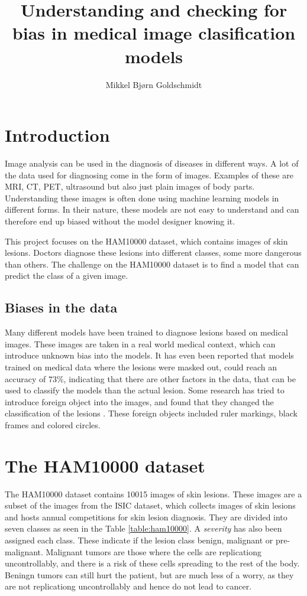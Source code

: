 \documentclass[11pt,a4paper]{article}
\title{Understanding and checking for bias in medical image clasification models}
\author{Mikkel Bjørn Goldschmidt}
\begin{document}
\maketitle

\section{Introduction}
Image analysis can be used in the diagnosis of diseases in different ways.
A lot of the data used for diagnosing come in the form of images.
Examples of these are MRI, CT, PET, ultrasound but also just plain images of body parts.
Understanding these images is often done using machine learning models in different forms.
In their nature, these models are not easy to understand and can therefore end up biased without
the model designer knowing it.

This project focuses on the HAM10000 dataset\cite{Tschandl_2018}, which contains images of skin lesions.
Doctors diagnose these lesions into different classes, some more dangerous than others.
The challenge on the HAM10000 dataset is to find a model that can predict the class of a given image.

\subsection{Biases in the data}
Many different models have been trained to diagnose lesions based on medical images.
These images are taken in a real world medical context, which can introduce unknown bias into the models.
It has even been reported that models trained on medical data where the lesions were masked out,
could reach an accuracy of $73\%$\cite{DeConstructing_Bias_on_Skin_Lesion_Datasets_2019}, indicating that there are other factors in the data, 
that can be used to classify the models than the actual lesion.
Some research has tried to introduce foreign object into the images,
and found that they changed the classification of the lesions \cite{Towards_Explainable_Classifiers_Using_the_Counterfactual_Approach_2019}.
These foreign objects included ruler markings, black frames and colored circles.

\section{The HAM10000 dataset}
The HAM10000 dataset contains 10015 images of skin lesions.
These images are a subset of the images from the ISIC dataset\cite{ISIC_Dataset_2018},
which collects images of skin lesions and hosts annual competitions for skin lesion diagnosis.
They are divided into seven classes as seen in the Table \ref{table:ham10000}.
A \textit{severity} has also been assigned each class.
These indicate if the lesion class benign, malignant or pre-malignant.
Malignant tumors are those where the cells are replicationg uncontrollably,
and there is a risk of these cells spreading to the rest of the body.
Beningn tumors can still hurt the patient, but are much less of a worry,
as they are not replicationg uncontrollably and hence do not lead to cancer.
\end{document}
